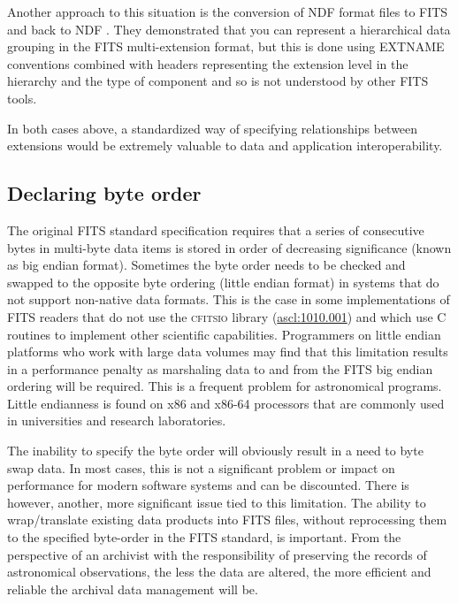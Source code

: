\documentclass[final,authoryear,5p,times,twocolumn]{elsarticle}
\begin{document}
{{Another approach to this situation is the conversion of NDF
format files to FITS and back to NDF \citep{SUN55,1997STARB..19...14C}.
They demonstrated that you can represent a hierarchical data grouping
in the FITS multi-extension format, but this is done using EXTNAME
conventions combined with headers representing the extension level in
the hierarchy and the type of component and so is not understood by
other FITS tools.

In both cases above, a standardized way of specifying relationships
between extensions would be extremely valuable to data and application interoperability.


\subsection{Declaring byte order}
\label{section_byte_order}

The original FITS standard specification \citep{1981A&AS...44..363W}
requires that a series of consecutive bytes in multi-byte data items is
stored in order of decreasing significance (known as big endian format).
Sometimes the byte order needs to be checked and swapped to the opposite
byte ordering (little endian format) in systems that do not support
non-native data formats.  This is the case in some implementations of FITS
readers that do not use the \textsc{cfitsio} library
(\href{http://ascl.net/1010.001}{ascl:1010.001}) and which use C routines
to implement other scientific capabilities.  Programmers on little endian
platforms who work with large data volumes may find that this limitation
results in a performance penalty as marshaling data to and from
the FITS big endian ordering will be required.  This is a frequent problem
for astronomical programs. Little endianness is found on x86 and x86-64
processors that are commonly used in universities and research
laboratories.


The inability to specify the byte order will obviously result in a
need to byte swap data. In most cases, this is not a significant
problem or impact on performance for modern software systems and
can be discounted. There is however, another, more significant issue
tied to this limitation. The ability to wrap/translate existing data products
into FITS files, without reprocessing them to the specified
byte-order in the FITS standard, is important. From
the perspective of an archivist with the responsibility of preserving the
records of astronomical observations, the less the data are altered, the
more efficient and reliable the archival data management will be.


}}
\end{document}
